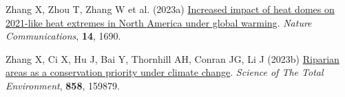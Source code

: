\documentclass[
  12pt,
]{article}
\newlength{\cslhangindent}
\newenvironment{CSLReferences}[2] %
 {\begin{list}{}{%
  \setlength{\itemindent}{0pt}
  \setlength{\leftmargin}{0pt}
  \setlength{\parsep}{0pt}
  \ifodd #1
   \setlength{\leftmargin}{\cslhangindent}
   \setlength{\itemindent}{-1\cslhangindent}
  \fi
  \setlength{\itemsep}{#2\baselineskip}}}
 {\end{list}}
\begin{document}
\begin{CSLReferences}{1}{0}
Zhang X, Zhou T, Zhang W et al. (2023a) \href{https://doi.org/10.1038/s41467-023-37309-y}{Increased impact of heat domes on 2021-like heat extremes in {North} {America} under global warming}. \emph{Nature Communications}, \textbf{14}, 1690.

Zhang X, Ci X, Hu J, Bai Y, Thornhill AH, Conran JG, Li J (2023b) \href{https://doi.org/10.1016/j.scitotenv.2022.159879}{Riparian areas as a conservation priority under climate change}. \emph{Science of The Total Environment}, \textbf{858}, 159879.

\end{CSLReferences}
\end{document}
